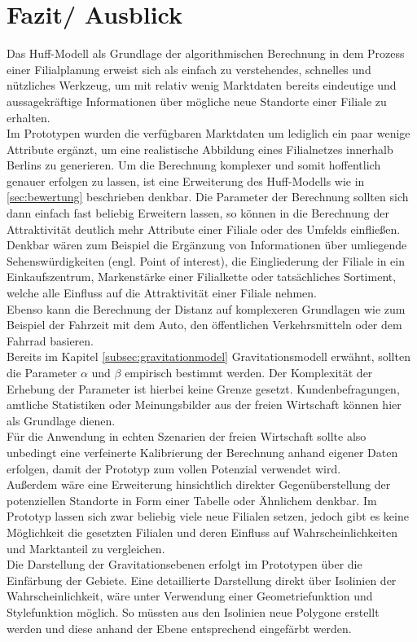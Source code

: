 \section{Fazit/ Ausblick}
Das Huff-Modell als Grundlage der algorithmischen Berechnung in dem Prozess einer Filialplanung erweist sich als einfach zu verstehendes, schnelles und nützliches Werkzeug, um mit relativ wenig Marktdaten bereits eindeutige und aussagekräftige Informationen über mögliche neue Standorte einer Filiale zu erhalten.\\
Im Prototypen wurden die verfügbaren Marktdaten um lediglich ein paar wenige Attribute ergänzt, um eine realistische Abbildung eines Filialnetzes innerhalb Berlins zu generieren. 
Um die Berechnung komplexer und somit hoffentlich genauer erfolgen zu lassen, ist eine Erweiterung des Huff-Modells wie in \ref{sec:bewertung} beschrieben denkbar.
Die Parameter der Berechnung sollten sich dann einfach fast beliebig Erweitern lassen, so können in die Berechnung der Attraktivität deutlich mehr Attribute einer Filiale oder des Umfelds einfließen.
Denkbar wären zum Beispiel die Ergänzung von Informationen über umliegende Sehenswürdigkeiten (engl. Point of interest), die Eingliederung der Filiale in ein Einkaufszentrum, Markenstärke einer Filialkette oder tatsächliches Sortiment, welche alle Einfluss auf die Attraktivität einer Filiale nehmen.\\
Ebenso kann die Berechnung der Distanz auf komplexeren Grundlagen wie zum Beispiel der Fahrzeit mit dem Auto, den öffentlichen Verkehrsmitteln oder dem Fahrrad basieren.\\
Bereits im Kapitel \ref{subsec:gravitationmodel} Gravitationsmodell erwähnt, sollten die Parameter $\alpha$ und $\beta$ empirisch bestimmt werden.
Der Komplexität der Erhebung der Parameter ist hierbei keine Grenze gesetzt. 
Kundenbefragungen, amtliche Statistiken oder Meinungsbilder aus der freien Wirtschaft können hier als Grundlage dienen.\\
Für die Anwendung in echten Szenarien der freien Wirtschaft sollte also unbedingt eine verfeinerte Kalibrierung der Berechnung anhand eigener Daten erfolgen, damit der Prototyp zum vollen Potenzial verwendet wird.\\
Außerdem wäre eine Erweiterung hinsichtlich direkter Gegenüberstellung der potenziellen Standorte in Form einer Tabelle oder Ähnlichem denkbar.
Im Prototyp lassen sich zwar beliebig viele neue Filialen setzen, jedoch gibt es keine Möglichkeit die gesetzten Filialen und deren Einfluss auf Wahrscheinlichkeiten und Marktanteil zu vergleichen.\\
Die Darstellung der Gravitationsebenen erfolgt im Prototypen über die Einfärbung der Gebiete.
Eine detaillierte Darstellung direkt über Isolinien der Wahrscheinlichkeit, wäre unter Verwendung einer Geometriefunktion und Stylefunktion möglich. 
So müssten aus den Isolinien neue Polygone erstellt werden und diese anhand der Ebene entsprechend eingefärbt werden.

